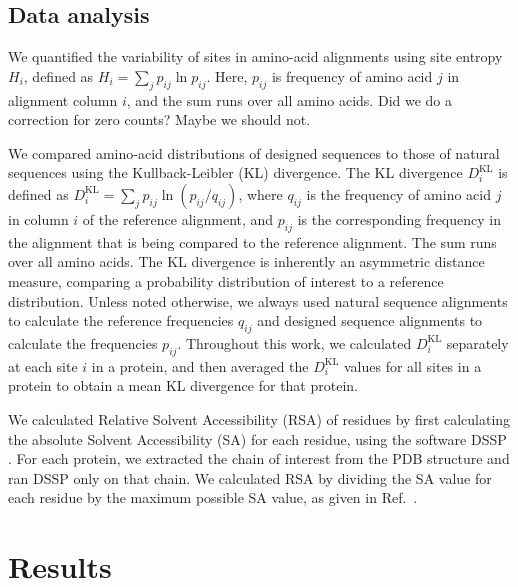 \documentclass[12pt]{article}
\begin{document}
\subsection{Data analysis}

We quantified the variability of sites in amino-acid alignments using site entropy $H_i$, defined as $H_i=\sum_{j}p_{ij}\ln p_{ij}$. Here, $p_{ij}$ is frequency of amino acid $j$ in alignment column $i$, and the sum runs over all amino acids. {\color{red}Did we do a correction for zero counts? Maybe we should not.}

We compared amino-acid distributions of designed sequences to those of natural sequences using the Kullback-Leibler (KL) divergence. The KL divergence $D^\text{KL}_i$ is defined as $D^\text{KL}_i= \sum_j  p_{ij} \ln  (p_{ij}/q_{ij})$, where $q_{ij}$ is the frequency of amino acid $j$ in column $i$ of the reference alignment, and $p_{ij}$ is the corresponding frequency in the alignment that is being compared to the reference alignment. The sum runs over all amino acids. The KL divergence is inherently an asymmetric distance measure, comparing a probability distribution of interest to a reference distribution. Unless noted otherwise, we always used natural sequence alignments to calculate the reference frequencies $q_{ij}$ and designed sequence alignments to calculate the frequencies $p_{ij}$. Throughout this work, we calculated $D^\text{KL}_i$ separately at each site $i$ in a protein, and then averaged the $D^\text{KL}_i$ values for all sites in a protein to obtain a mean KL divergence for that protein.

We calculated Relative Solvent Accessibility (RSA) of residues by first calculating the absolute Solvent Accessibility (SA) for each residue, using the software DSSP \cite{Kabsch1983}. For each protein, we extracted the chain of interest from the PDB structure and ran DSSP only on that chain. We calculated RSA by dividing the SA value for each residue by the maximum possible SA value, as given in Ref.\ \cite{Tien}. 

\section{Results}
\label{Results}
\end{document}

